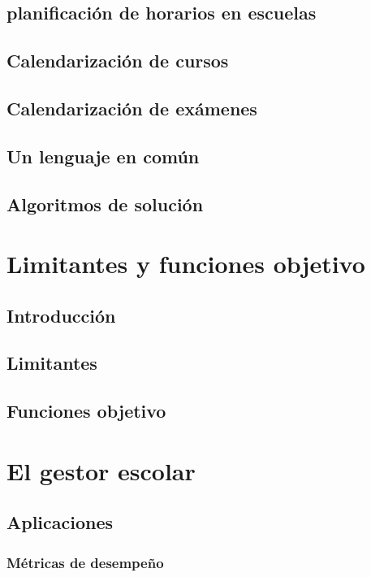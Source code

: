 \documentclass[draft,12pt,headsepline,footsepline,paper=letter]{scrreprt}
\begin{document}
\section{planificación de horarios en escuelas}

\section{Calendarización de cursos}

\section{Calendarización de exámenes}

\section{Un lenguaje en común}

\section{Algoritmos de solución}

\chapter{Limitantes y funciones objetivo}

\section{Introducción}

\section{Limitantes}

\section{Funciones objetivo}

\chapter{El gestor escolar}

\section{Aplicaciones}

\subsection{Métricas de desempeño}
\end{document}

